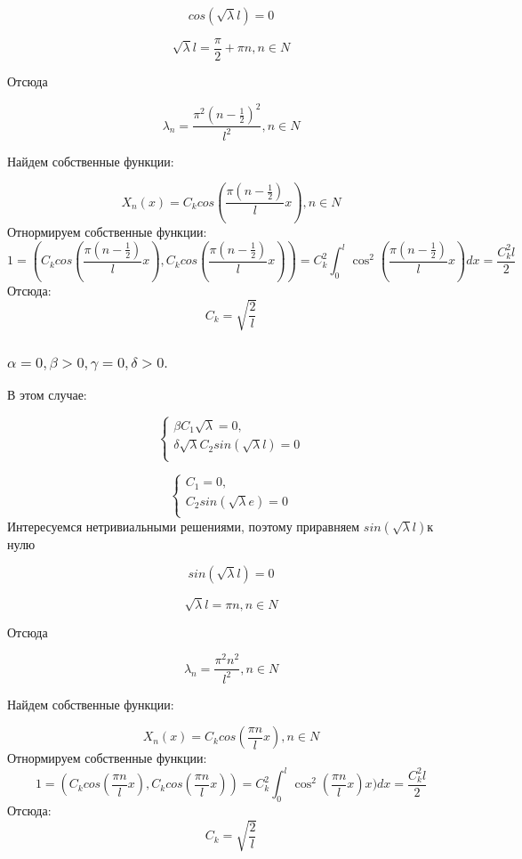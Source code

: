 \documentclass[12pt, a4paper]{report}
\begin{document}
\[cos(\sqrt{\lambda}l) =0\]

\[\sqrt{\lambda}l = \frac{\pi}{2} +\pi n, n \in N\]

Отсюда 

\[\lambda_n = \frac{\pi^2(n-\frac{1}{2})^2}{l^2}, n \in N\]

Найдем собственные функции:

\[X_n(x)=C_{k}cos(\frac{\pi(n-\frac{1}{2})}{l}x), n \in N\]
Отнормируем собственные функции:
\[1=(C_{k}cos(\frac{\pi(n-\frac{1}{2})}{l}x),C_{k}cos(\frac{\pi(n-\frac{1}{2})}{l}x))=C_{k}^2\int_{0}^{l} \cos^2(\frac{\pi(n-\frac{1}{2})}{l}x)dx=\frac{C_{k}^2l}{2}\]
Отсюда:
\[C_{k}=\sqrt{\frac{2}{l}}\]

\subsubsection{ $ \alpha = 0, \beta > 0, \gamma = 0, \delta > 0. $}

В этом случае:

\begin{equation*}
 \begin{cases}
\beta C_1 \sqrt{\lambda}=0, 
   \\
\delta \sqrt{\lambda} C_2 sin (\sqrt{\lambda}l )=0
   \\  
 \end{cases}
\end{equation*}

\begin{equation*}
 \begin{cases}
C_1=0, 
   \\
C_2 sin (\sqrt{\lambda}e )=0
   \\  
 \end{cases}
\end{equation*}
Интересуемся нетривиальными решениями, поэтому приравняем $sin(\sqrt{\lambda}l ) $к нулю

\[sin(\sqrt{\lambda}l ) =0\]

\[\sqrt{\lambda}l = \pi n, n \in N\]

Отсюда 

\[\lambda_n = \frac{\pi^2n^2}{l^2}, n \in N\]

Найдем собственные функции:

\[X_n(x)=C_{k}cos(\frac{\pi n}{l}x), n \in N\]
Отнормируем собственные функции:
\[1=(C_{k}cos(\frac{\pi n}{l}x),C_{k}cos(\frac{\pi n}{l}x))=C_{k}^2\int_{0}^{l} \cos^2(\frac{\pi n}{l}x)x)dx=\frac{C_{k}^2l}{2}\]
Отсюда:
\[C_{k}=\sqrt{\frac{2}{l}}\]
\end{document}

